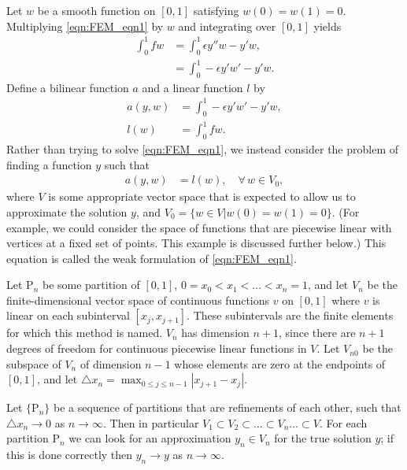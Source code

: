 Let $w$ be a smooth function on $[0,1]$ satisfying $w(0) = w(1) = 0$.
Multiplying \eqref{eqn:FEM_eqn1} by $w$ and integrating over $[0,1]$ yields
\begin{align*}
	\int_0^1 f w &= \int_0^1 \epsilon y''w - y'w, \\
	&= \int_0^1 -\epsilon y'w' - y'w.
\end{align*}
Define a bilinear function $a$ and a linear function $l$ by
\begin{align*}
a(y,w) &= \int_0^1 -\epsilon y'w' - y'w,\\
l(w) &= \int_0^1 f w.
\end{align*}
Rather than trying to solve \eqref{eqn:FEM_eqn1}, we instead consider the problem of finding a function $y$ such that
\begin{align}
	a(y,w) &= l(w), \quad \forall \, w \in V_0,
	\label{eqn:FEM_integral_form}
\end{align}
where $V$ is some appropriate vector space that is expected to allow us to approximate the solution $y$, and $V_0 = \{w \in V|w(0) = w(1) = 0\}$.
(For example, we could consider the space of functions that are piecewise linear with vertices at a fixed set of points.
This example is discussed further below.)
This equation is called the weak formulation of \eqref{eqn:FEM_eqn1}.

Let $\mathrm{P}_n$ be some partition of $[0,1]$, $0 = x_0 < x_1< \ldots < x_{n} = 1$, and let $V_n$ be the finite-dimensional vector space of continuous functions $v$ on $[0,1]$ where $v$ is linear on each subinterval $[{x_j,x_{j+1}}]$.
These subintervals are the finite elements for which this method is named.
$V_n$ has dimension $n+1$, since there are $n+1$ degrees of freedom for continuous piecewise linear functions in $V$.
Let $V_{n0}$ be the subspace of $V_n$ of dimension $n-1$ whose elements are zero at the endpoints of $[0,1]$, and let $\triangle x_n = \max_{0 \leq j \leq n-1}|x_{j+1} - x_j|$.

Let $\{\mathrm{P}_n\}$ be a sequence of partitions that are refinements of each other, such that $\triangle x_n \to 0$ as $n \to \infty$.
Then in particular $V_1 \subset V_2 \subset \ldots \subset V_n \ldots \subset V$.
For each partition $\mathrm{P}_n$ we can look for an approximation $y_n \in V_n$ for the true solution $y$; if this is done  correctly then $y_n \to y$ as $n \to \infty$.

